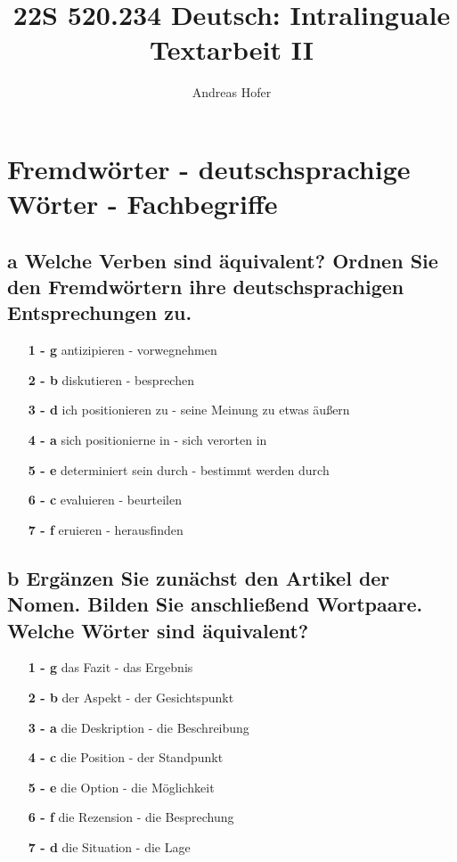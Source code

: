 \documentclass{article}
\title{\vspace{-3cm}22S 520.234 Deutsch: Intralinguale Textarbeit II}
\author{Andreas Hofer}
\begin{document}
	\section*{Fremdwörter - deutschsprachige Wörter - Fachbegriffe}
	\subsection*{\textbf{a}  Welche Verben sind äquivalent? Ordnen Sie den Fremdwörtern ihre deutschsprachigen Entsprechungen zu.}
	\begin{itemize}
		\item[\textbf{1 - g}]{antizipieren - vorwegnehmen}
		\item[\textbf{2 - b}]{diskutieren - besprechen}
		\item[\textbf{3 - d}]{ich positionieren zu - seine Meinung zu etwas äußern}
		\item[\textbf{4 - a}]{sich positionierne in - sich verorten in}
		\item[\textbf{5 - e}]{determiniert sein durch - bestimmt werden durch}
		\item[\textbf{6 - c}]{evaluieren - beurteilen}
		\item[\textbf{7 - f}]{eruieren - herausfinden}
	\end{itemize}
	\subsection*{\textbf{b}  Ergänzen Sie zunächst den Artikel der Nomen. Bilden Sie anschließend Wortpaare. Welche Wörter sind äquivalent?}
	\begin{itemize}
		\item[\textbf{1 - g}]{das Fazit - das Ergebnis}
		\item[\textbf{2 - b}]{der Aspekt - der Gesichtspunkt}
		\item[\textbf{3 - a}]{die Deskription - die Beschreibung}
		\item[\textbf{4 - c}]{die Position - der Standpunkt}
		\item[\textbf{5 - e}]{die Option - die Möglichkeit}
		\item[\textbf{6 - f}]{die Rezension - die Besprechung}
		\item[\textbf{7 - d}]{die Situation - die Lage}
	\end{itemize}
\end{document}
